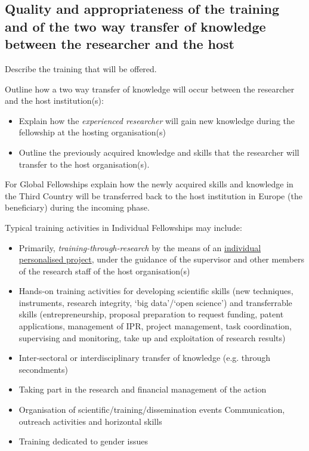 \subsection{Quality and appropriateness of the training and of the two way transfer of knowledge between the researcher and the host}
\label{sec:excellence_transfer}

Describe the training that will be offered.

\noindent
Outline how a two way transfer of knowledge will occur between the researcher and the host institution(s):
\begin{itemize}
\item Explain how the \emph{experienced researcher} will gain new knowledge during the fellowship at the hosting organisation(s)
\item Outline the previously acquired knowledge and skills that the researcher will transfer to the host organisation(s).
\end{itemize}

For Global Fellowships explain how the newly acquired skills and knowledge in the Third Country will be transferred back to the host institution in Europe (the beneficiary) during the incoming phase.

Typical training activities in Individual Fellowships may include:
\begin{itemize}
\item
  Primarily, \emph{training-through-research} by the means of an
  \ul{individual personalised project}, under the guidance of the
  supervisor and other members of the research staff of the host
  organisation(s)
\item
  Hands-on training activities for developing scientific skills (new
  techniques, instruments, research integrity, `big data'/`open
  science') and transferrable skills (entrepreneurship, proposal
  preparation to request funding, patent applications, management of
  IPR, project management, task coordination, supervising and
  monitoring, take up and exploitation of research results)
\item
  Inter-sectoral or interdisciplinary transfer of knowledge (e.g.
  through secondments)
\item
  Taking part in the research and financial management of the action
\item
  Organisation of scientific/training/dissemination events
  Communication, outreach activities and horizontal skills
\item
  Training dedicated to gender issues
\end{itemize}




